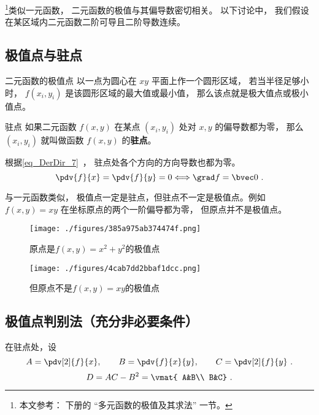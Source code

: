 

\footnote{本文参考： \cite{同济高} 下册的 “多元函数的极值及其求法” 一节。}类似一元函数， 二元函数的极值与其偏导数密切相关。 以下讨论中， 我们假设在某区域内二元函数二阶可导且二阶导数连续。

\subsection{极值点与驻点}
\begin{definition}{二元函数的极值点}
以一点为圆心在 $xy$ 平面上作一个圆形区域， 若当半径足够小时， $f(x_i, y_i)$ 是该圆形区域的最大值或最小值， 那么该点就是极大值点或极小值点。 
\end{definition}

\begin{definition}{驻点}
如果二元函数 $f(x,y)$ 在某点 $(x_i, y_i)$ 处对 $x, y$ 的偏导数都为零， 那么 $(x_i, y_i)$ 就叫做函数 $f(x,y)$ 的\textbf{驻点}。 
\end{definition}
根据\autoref{eq_DerDir_7}~， 驻点处各个方向的方向导数也都为零。
\begin{equation}
\pdv{f}{x}=\pdv{f}{y}=0 \Longleftrightarrow \grad f=\bvec0~.
\end{equation}

与一元函数类似， 极值点一定是驻点，但驻点不一定是极值点。例如 $f(x,y) = xy$ 在坐标原点的两个一阶偏导都为零， 但原点并不是极值点。 

\begin{figure}[ht]
\centering
\texttt{[image: ./figures/385a975ab374474f.png]}
\caption{原点是$f(x,y)=x^2+y^2$的极值点} \label{fig_F2Exm_1}
\end{figure}


\begin{figure}[ht]
\centering
\texttt{[image: ./figures/4cab7dd2bbaf1dcc.png]}
\caption{但原点不是$f(x,y)=xy$的极值点} \label{fig_F2Exm_2}
\end{figure}

\subsection{极值点判别法（充分非必要条件）}
在驻点处，设
\begin{equation}
A=\pdv[2]{f}{x},\qquad B=\pdv{f}{x}{y},\qquad C=\pdv[2]{f}{y}~.
\end{equation}
\begin{equation}
D=AC-B^2=
\vmat{
A&B\\
B&C}~.
\end{equation}

